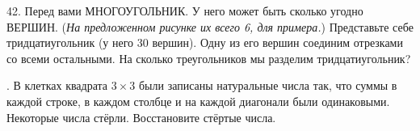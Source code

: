 42. Перед вами МНОГОУГОЛЬНИК. У него может быть сколько угодно ВЕРШИН. ({\it На предложенном рисунке их всего 6, для примера.}) Представьте себе тридцатиугольник (у него 30 вершин). Одну из его вершин соединим отрезками со всеми остальными. На сколько треугольников мы разделим тридцатиугольник?
\begin{center}
\begin{figure}[ht!]
\end{figure}
\end{center}
\newpage
{}. В клетках квадрата $3\times3$ были записаны натуральные числа так, что суммы в каждой строке, в каждом столбце и на каждой диагонали были одинаковыми. Некоторые числа стёрли. Восстановите стёртые числа.
\begin{center}
\begin{figure}[ht!]
\end{figure}
\end{center}
